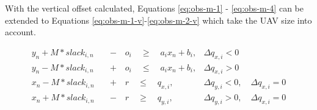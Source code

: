 With the vertical offset calculated, Equations \ref{eq:obs-m-1} - \ref{eq:obs-m-4} can be extended to Equations \ref{eq:obs-m-1-v}-\ref{eq:obs-m-2-v} which take the UAV size into account.

\begin{align}
y_{n} + M*slack_{i,n} \quad &- \quad o_i \quad \geq 
\quad a_{i} x_{n} + b_{i},  	
& \Delta q_{x,i} < 0 							 	
\label{eq:obs-m-1-v} \\
y_{n} - M*slack_{i,n} \quad &+ \quad o_i \quad \leq 
\quad a_{i} x_{n} + b_{i},
& \Delta q_{x,i} > 0 							 	
\label{eq:obs-m-2-v} \\
x_{n} - M*slack_{i,n} \quad &+ \quad r \quad \leq
\quad  q_{x,i}, 		
& \Delta q_{y,i} < 0, \quad \Delta q_{x,i} = 0 	
\label{eq:obs-m-3-v} \\
x_{n} + M*slack_{i,n} \quad &- \quad r \quad \geq 
\quad q_{y,i},  		
& \Delta q_{y,i} > 0, \quad \Delta q_{x,i} = 0 	
\label{eq:obs-m-4-v}
\end{align}


